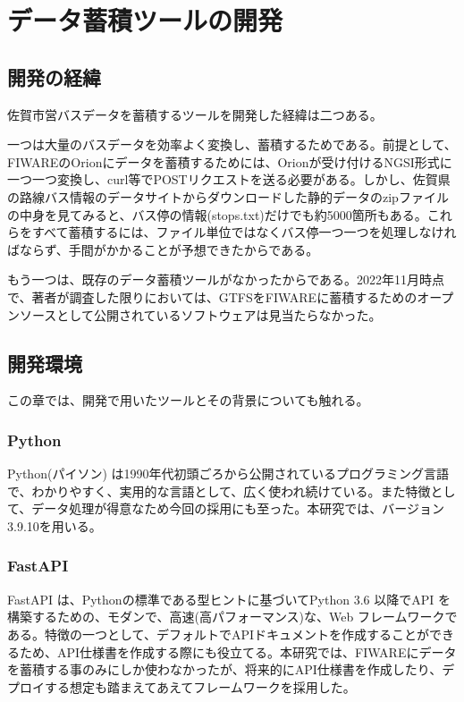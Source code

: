 \documentclass[a4paper, 12pt]{jsreport}
\begin{document}
  \chapter{データ蓄積ツールの開発}
  \section{開発の経緯}
  \par 佐賀市営バスデータを蓄積するツールを開発した経緯は二つある。 \par 一つは大量のバスデータを効率よく変換し、蓄積するためである。前提として、FIWAREのOrionにデータを蓄積するためには、Orionが受け付けるNGSI形式に一つ一つ変換し、curl等でPOSTリクエストを送る必要がある。しかし、佐賀県の路線バス情報のデータサイトからダウンロードした静的データのzipファイルの中身を見てみると、バス停の情報(stops.txt)だけでも約5000箇所もある。これらをすべて蓄積するには、ファイル単位ではなくバス停一つ一つを処理しなければならず、手間がかかることが予想できたからである。
  \par もう一つは、既存のデータ蓄積ツールがなかったからである。2022年11月時点で、著者が調査した限りにおいては、GTFSをFIWAREに蓄積するためのオープンソースとして公開されているソフトウェアは見当たらなかった。
  \section{開発環境}
  この章では、開発で用いたツールとその背景についても触れる。
  \subsection{Python}
  \par Python(パイソン)
  は1990年代初頭ごろから公開されているプログラミング言語で、わかりやすく、実用的な言語として、広く使われ続けている。また特徴として、データ処理が得意なため今回の採用にも至った。本研究では、バージョン3.9.10を用いる。
  \subsection{FastAPI}
  \par FastAPI は、Pythonの標準である型ヒントに基づいてPython 3.6 以降でAPI を構築するための、モダンで、高速(高パフォーマンス)な、Web
  フレームワークである。特徴の一つとして、デフォルトでAPIドキュメントを作成することができるため、API仕様書を作成する際にも役立てる。本研究では、FIWAREにデータを蓄積する事のみにしか使わなかったが、将来的にAPI仕様書を作成したり、デプロイする想定も踏まえてあえてフレームワークを採用した。
\end{document}
